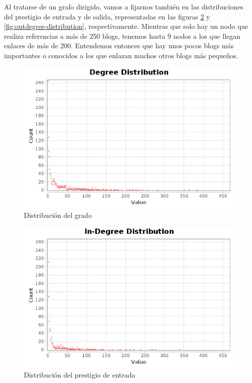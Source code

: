 Al tratarse de un grafo dirigido, vamos a fijarnos también en las distribuciones
del prestigio de entrada y de salida, representadas en las figuras
\ref{fig:indegree-distribution} y \ref{fig:outdegree-distribution},
respectivamente. Mientras que solo hay un nodo que realiza referencias a más de
250 blogs, tenemos hasta 9 nodos a los que llegan enlaces de más de 200.
Entendemos entonces que hay unos pocos blogs más importantes o conocidos a los
que enlazan muchos otros blogs más pequeños.

\begin{figure}
    \includegraphics[width=\textwidth]{images/plots/degree-distribution.png}
    \caption{Distribución del grado}
    \label{fig:degree-distribution}
\end{figure}

\begin{figure}
    \includegraphics[width=\textwidth]{images/plots/indegree-distribution.png}
    \caption{Distribución del prestigio de entrada}
    \label{fig:indegree-distribution}
\end{figure}

